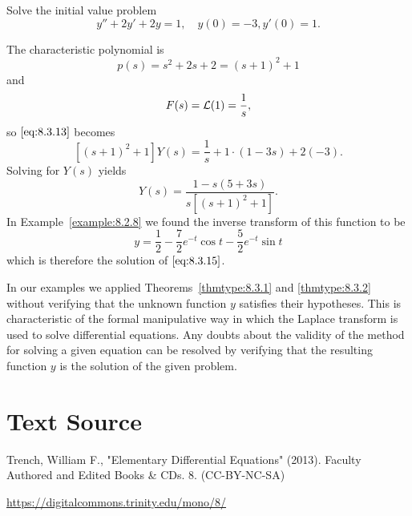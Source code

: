 \documentclass{ximera}
\begin{document}
\begin{example}\label{example:8.3.4}
 Solve the initial value problem
\begin{equation}\label{eq:8.3.15}
y''+2y'+2y=1, \quad   y(0)=-3,  y'(0)=1.
\end{equation}
\begin{explanation}
The characteristic polynomial is
$$
p(s)=s^2+2s+2=(s+1)^2+1
$$
and
$$
F(s)={\cal L}(1)=\frac{1}{s},
$$
so $\eqref{eq:8.3.13}$ becomes
$$
\left[(s+1)^2+1\right] Y(s)=\frac{1}{s}+1\cdot(1-3s)+2(-3).
$$
Solving for $Y(s)$ yields
$$
Y(s)=\frac{1-s(5+3s)}{s\left[(s+1)^2+1\right]}.
$$
In Example~\ref{example:8.2.8}  we found the inverse transform of this
function to be
$$
y=\frac{1}{2}-\frac{7}{2}e^{-t}\cos t-\frac{5}{2}e^{-t}\sin t
$$
which is therefore  the solution of $\eqref{eq:8.3.15}$.

\begin{center}
\end{center}


\end{explanation}
\end{example}

\begin{remark}
In our examples we applied Theorems~\ref{thmtype:8.3.1} and
\ref{thmtype:8.3.2}
without verifying that the unknown function $y$ satisfies their
hypotheses. This is characteristic of the formal manipulative way in
which the Laplace transform is used to solve differential equations.
Any doubts about the validity of the method for solving a given
equation can be resolved by verifying that the resulting function $y$
is  the solution of the given problem.
\end{remark}


\section*{Text Source}
Trench, William F., "Elementary Differential Equations" (2013). Faculty Authored and Edited Books \& CDs. 8. (CC-BY-NC-SA)

\href{https://digitalcommons.trinity.edu/mono/8/}{https://digitalcommons.trinity.edu/mono/8/}
\end{document}
